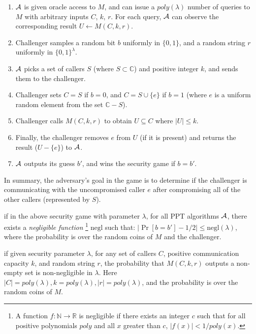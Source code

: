 \begin{enumerate}
\item $\mathcal{A}$ is given oracle access to $M$, and can issue a 
  $poly(\lambda)$ number of queries to $M$ with arbitrary inputs $C$, $k$, $r$.
For each query, $\mathcal{A}$ can observe the corresponding result 
  $U \leftarrow M(C, k, r)$. 

\item Challenger samples a random bit $b$ uniformly in $\{0, 1\}$,
  and a random string $r$ uniformly in ${\{0, 1\}}^\lambda$.

\item $\mathcal{A}$ picks a set of callers $S$ (where $S \subset \mathbb{C}$) and 
  positive integer $k$, and sends them to the challenger.

\item Challenger sets $C = S$ if $b = 0$, and $C = S \cup \{e\}$ if 
  $b = 1$ (where $e$ is a uniform random element from the set $\mathbb{C} - S$).

\item Challenger calls $M(C, k, r)$ to obtain $U \subseteq C$ where $|U| \leq k$.

\item Finally, the challenger removes $e$ from $U$ (if it is present) and returns 
  the result ($U - \{e\}$) to $\mathcal{A}$.\label{game:remove}

\item $\mathcal{A}$ outputs its guess $b'$, and wins the security game if $b = b'$.
\end{enumerate}

In summary, the adversary's goal in the game is to determine if 
  the challenger is communicating with the uncompromised caller $e$ after 
  compromising all of the other callers (represented by $S$).

\label{def:private-machine}
  if in the above security game with parameter $\lambda$, 
  for all PPT algorithms $\mathcal{A}$, there exists a
  \emph{negligible function}%
%
\footnote{A function $f: \mathbb{N}\rightarrow\mathbb{R}$ is negligible if
    there exists an integer $c$ such that for all positive polynomials $poly$
    and all $x$ greater than $c$, $|f(x)| < 1/poly(x)$.}
%
  $\textrm{negl}$ such that: 
  $|\Pr[b = b'] - 1/2| \leq \textrm{negl}(\lambda)$, where
  the probability is over the random coins of $M$ and the challenger.

\label{def:liveness} if given security
  parameter $\lambda$, for any set of callers $C$, positive 
  communication capacity $k$, and random 
  string $r$, the probability that $M(C, k, r)$ outputs a non-empty set is non-negligible in $\lambda$. 
Here $|C| = poly(\lambda), k = poly(\lambda), |r| = poly(\lambda)$,
  and the probability is over the random coins of $M$.
